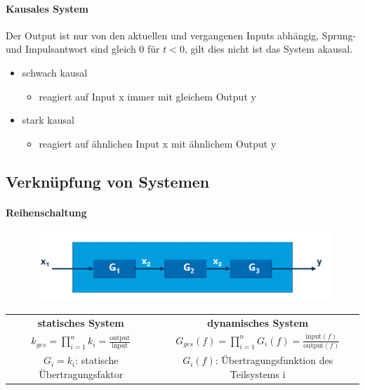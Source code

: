 \documentclass[12pt,a4paper]{article}
\begin{document}
\paragraph{Kausales System}
Der Output ist nur von den aktuellen und vergangenen Inputs abhängig, Sprung- und Impulsantwort sind gleich 0 für $t < 0$, gilt dies nicht ist das System akausal.
\begin{itemize}
\item schwach kausal
\begin{itemize}
\item reagiert auf Input x immer mit gleichem Output y
\end{itemize}
\item stark kausal
\begin{itemize}
\item reagiert auf ähnlichen Input x mit ähnlichem Output y
\end{itemize}
\end{itemize}

\subsection{Verknüpfung von Systemen}

\paragraph{Reihenschaltung}
\hspace{1pt}
\begin{figure}[H]
\includegraphics[scale=0.5]{./resources/reihenschaltung.png}
\end{figure}
\begin{tabular}{|c|c|}
\hline
\textbf{statisches System} & \textbf{dynamisches System} \\
$\displaystyle k_{ges} = \prod_{i=1}^n k_i = \frac{\text{output}}{\text{input}}$ & $\displaystyle G_{ges}(f) = \prod_{i=1}^n G_i(f) = \frac{\text{input}(f)}{\text{output}(f)}$ \\
\hline
$G_i = k_i$: statische Übertragungsfaktor & $G_i(f)$: Übertragungsfunktion des Teilsystems i \\
\hline
\end{tabular}
\newpage
\end{document}
